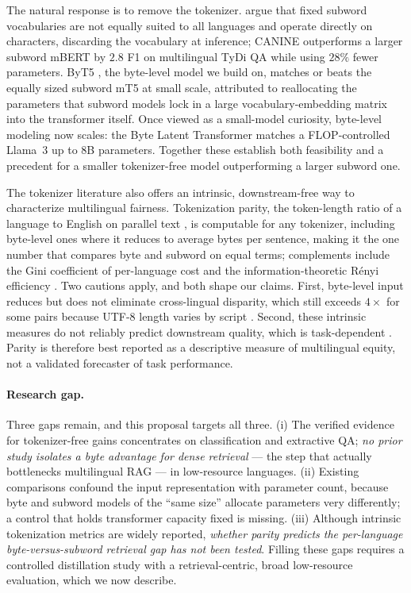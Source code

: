 \documentclass[11pt]{article}
\begin{document}
The natural response is to remove the tokenizer. \citet{clark2022canine} argue that fixed subword
vocabularies are not equally suited to all languages and operate directly on characters, discarding
the vocabulary at inference; CANINE outperforms a larger subword mBERT by $2.8$ F1 on multilingual
TyDi QA while using $28\%$ fewer parameters. ByT5 \citep{xue2022byt5}, the byte-level model we build
on, matches or beats the equally sized subword mT5 \citep{xue2021mt5} at small scale, attributed to
reallocating the parameters that subword models lock in a large vocabulary-embedding matrix into the
transformer itself. Once viewed as a small-model curiosity, byte-level modeling now scales: the Byte
Latent Transformer \citep{pagnoni2024blt} matches a FLOP-controlled Llama~3 up to 8B parameters.
Together these establish both feasibility and a precedent for a smaller tokenizer-free model
outperforming a larger subword one.

The tokenizer literature also offers an intrinsic, downstream-free way to characterize multilingual
fairness. Tokenization parity, the token-length ratio of a language to English on parallel text
\citep{petrov2023, ahia2023}, is computable for any tokenizer, including byte-level ones where it
reduces to average bytes per sentence, making it the one number that compares byte and subword on
equal terms; complements include the Gini coefficient of per-language cost \citep{lee2026equity} and
the information-theoretic R\'enyi efficiency \citep{zouhar2023}. Two cautions apply, and both shape our
claims. First, byte-level input reduces but does not eliminate cross-lingual disparity, which still
exceeds $4\times$ for some pairs because UTF-8 length varies by script \citep{petrov2023}. Second,
these intrinsic measures do not reliably predict downstream quality, which is task-dependent
\citep{lee2026equity, ali2023tokenizer}. Parity is therefore best reported as a descriptive measure of
multilingual equity, not a validated forecaster of task performance.

\paragraph{Research gap.}
Three gaps remain, and this proposal targets all three. (i) The verified evidence for tokenizer-free
gains concentrates on classification and extractive QA; \emph{no prior study isolates a byte advantage
for dense retrieval} --- the step that actually bottlenecks multilingual RAG --- in low-resource
languages. (ii) Existing comparisons confound the input representation with parameter count, because
byte and subword models of the ``same size'' allocate parameters very differently; a control that
holds transformer capacity fixed is missing. (iii) Although intrinsic tokenization metrics are widely
reported, \emph{whether parity predicts the per-language byte-versus-subword retrieval gap has not been
tested}. Filling these gaps requires a controlled distillation study with a retrieval-centric, broad
low-resource evaluation, which we now describe.
\end{document}
